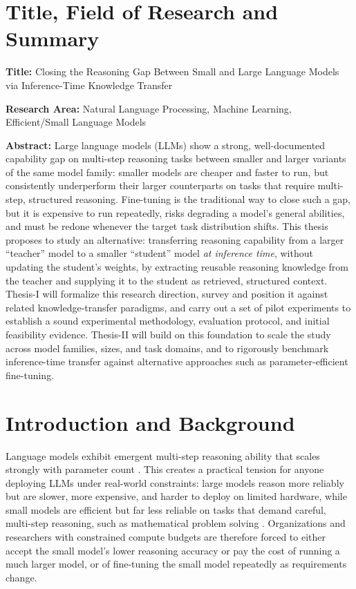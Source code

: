 \documentclass[a4, 12pt]{article}
\begin{document}
\newpage
\setcounter{page}{2}
\tableofcontents
\newpage

\section{Title, Field of Research and Summary}

\textbf{Title:} Closing the Reasoning Gap Between Small and Large Language Models via Inference-Time Knowledge Transfer

\textbf{Research Area:} Natural Language Processing, Machine Learning, Efficient/Small Language Models

\textbf{Abstract:} Large language models (LLMs) show a strong, well-documented capability gap on multi-step reasoning tasks between smaller and larger variants of the same model family: smaller models are cheaper and faster to run, but consistently underperform their larger counterparts on tasks that require multi-step, structured reasoning. Fine-tuning is the traditional way to close such a gap, but it is expensive to run repeatedly, risks degrading a model's general abilities, and must be redone whenever the target task distribution shifts. This thesis proposes to study an alternative: transferring reasoning capability from a larger ``teacher'' model to a smaller ``student'' model \emph{at inference time}, without updating the student's weights, by extracting reusable reasoning knowledge from the teacher and supplying it to the student as retrieved, structured context. Thesis-I will formalize this research direction, survey and position it against related knowledge-transfer paradigms, and carry out a set of pilot experiments to establish a sound experimental methodology, evaluation protocol, and initial feasibility evidence. Thesis-II will build on this foundation to scale the study across model families, sizes, and task domains, and to rigorously benchmark inference-time transfer against alternative approaches such as parameter-efficient fine-tuning.

\section{Introduction and Background}

Language models exhibit emergent multi-step reasoning ability that scales strongly with parameter count \cite{brown2020language, wei2022chain}. This creates a practical tension for anyone deploying LLMs under real-world constraints: large models reason more reliably but are slower, more expensive, and harder to deploy on limited hardware, while small models are efficient but far less reliable on tasks that demand careful, multi-step reasoning, such as mathematical problem solving \cite{hendrycks2021measuring, cobbe2021training}. Organizations and researchers with constrained compute budgets are therefore forced to either accept the small model's lower reasoning accuracy or pay the cost of running a much larger model, or of fine-tuning the small model repeatedly as requirements change.
\end{document}
